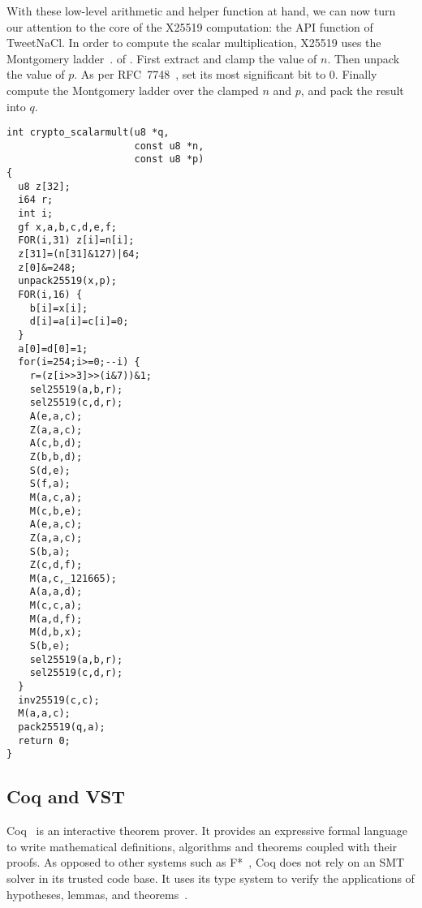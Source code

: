 With these low-level arithmetic and helper function at hand, we can now
turn our attention to the core of the X25519 computation: 
the  API function of TweetNaCl.
In order to compute the scalar multiplication, 
X25519 uses the Montgomery ladder~\cite{Mon85}.
of .
First extract and clamp the value of $n$. Then unpack the value of $p$.
As per RFC~7748~\cite{rfc7748}, set its most significant bit to 0.
Finally compute the Montgomery ladder over the clamped $n$ and $p$,
and pack the result into $q$.
\begin{lstlisting}[language=Ctweetnacl]
int crypto_scalarmult(u8 *q,
                      const u8 *n,
                      const u8 *p)
{
  u8 z[32];
  i64 r;
  int i;
  gf x,a,b,c,d,e,f;
  FOR(i,31) z[i]=n[i];
  z[31]=(n[31]&127)|64;
  z[0]&=248;
  unpack25519(x,p);
  FOR(i,16) {
    b[i]=x[i];
    d[i]=a[i]=c[i]=0;
  }
  a[0]=d[0]=1;
  for(i=254;i>=0;--i) {
    r=(z[i>>3]>>(i&7))&1;
    sel25519(a,b,r);
    sel25519(c,d,r);
    A(e,a,c);
    Z(a,a,c);
    A(c,b,d);
    Z(b,b,d);
    S(d,e);
    S(f,a);
    M(a,c,a);
    M(c,b,e);
    A(e,a,c);
    Z(a,a,c);
    S(b,a);
    Z(c,d,f);
    M(a,c,_121665);
    A(a,a,d);
    M(c,c,a);
    M(a,d,f);
    M(d,b,x);
    S(b,e);
    sel25519(a,b,r);
    sel25519(c,d,r);
  }
  inv25519(c,c);
  M(a,a,c);
  pack25519(q,a);
  return 0;
}
\end{lstlisting}

\subsection{Coq and VST}
\label{preliminaries:C}


Coq~\cite{coq-faq} is an interactive theorem prover. It provides an expressive
formal language to write mathematical definitions, algorithms and theorems coupled
with their proofs. As opposed to other systems such as F*~\cite{DBLP:journals/corr/BhargavanDFHPRR17},
Coq does not rely on an SMT solver in its trusted code base. 
It uses its type system to verify the applications of hypotheses, 
lemmas, and theorems~\cite{Howard1995-HOWTFN}.

